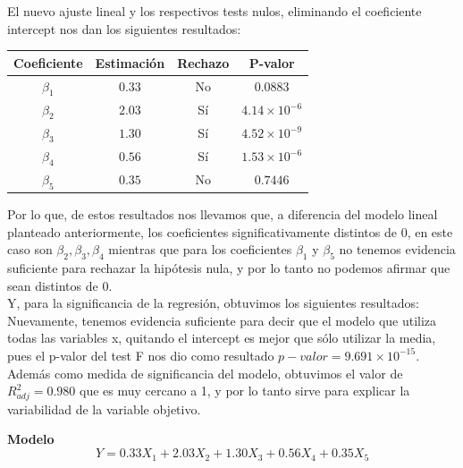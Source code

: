 El nuevo ajuste lineal y los respectivos tests nulos, eliminando el coeficiente intercept nos dan los siguientes resultados:
\begin{center}
    \begin{tabular}{|c|c|c|c|}
        \hline
        Coeficiente & Estimación & Rechazo & P-valor \\ \hline
        $\beta_1$ & $0.33$ & No & $0.0883$ \\ \hline
        $\beta_2$ & $2.03$ &  Sí & $ 4.14 \times 10^{-6}$ \\ \hline
        $\beta_3$ & $1.30$ & Sí  & $4.52 \times 10^{-9}$ \\ \hline
        $\beta_4$ & $0.56$ & Sí & $1.53 \times 10^{-6}$ \\ \hline
        $\beta_5$ & $0.35$ & No & $0.7446$ \\ \hline
    \end{tabular}
\end{center}
Por lo que, de estos resultados nos llevamos que, a diferencia del modelo lineal planteado anteriormente, los coeficientes significativamente distintos de 0, en este caso son $\beta_2, \beta_3, \beta_4$ mientras que para los coeficientes $\beta_1$ y $\beta_5$ no tenemos evidencia suficiente para rechazar la hipótesis nula, y por lo tanto no podemos afirmar que sean distintos de 0.\\
Y, para la significancia de la regresión, obtuvimos los siguientes resultados:\\
Nuevamente, tenemos evidencia suficiente para decir que el modelo que utiliza todas las variables x, quitando el intercept es mejor que sólo utilizar la media, pues el p-valor del test F nos dio como resultado $p-valor = 9.691 \times 10^{-15}$.\\
Además como medida de significancia del modelo, obtuvimos el valor de $R^{2}_{adj} = 0.980$ que es muy cercano a 1, y por lo tanto sirve para explicar la variabilidad de la variable objetivo.

\vskip0.2cm\textbf{Modelo}\\
\begin{equation}\tag{M2}
    Y = 0.33 X_{1} + 2.03 X_{2} + 1.30 X_{3} + 0.56 X_{4} + 0.35 X_{5}
\end{equation}

